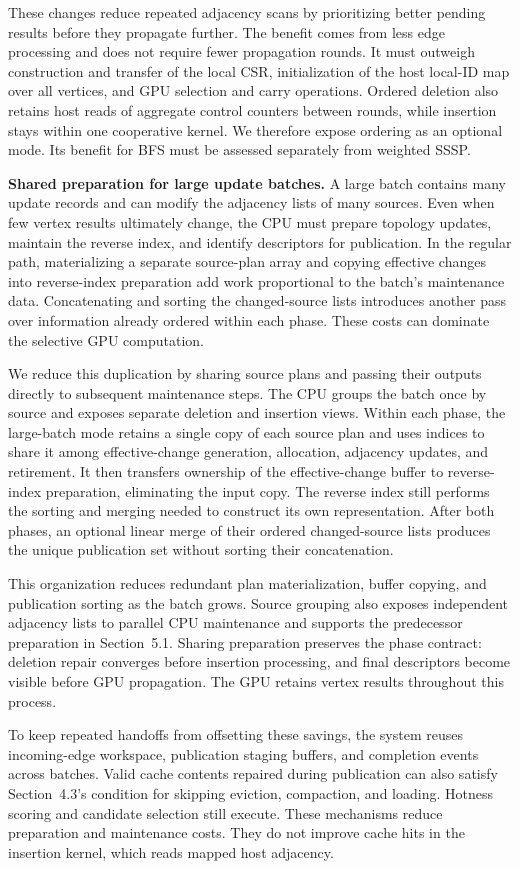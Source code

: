 These changes reduce repeated adjacency scans by prioritizing better pending results before they propagate further. The benefit comes from less edge processing and does not require fewer propagation rounds. It must outweigh construction and transfer of the local CSR, initialization of the host local-ID map over all vertices, and GPU selection and carry operations. Ordered deletion also retains host reads of aggregate control counters between rounds, while insertion stays within one cooperative kernel. We therefore expose ordering as an optional mode. Its benefit for BFS must be assessed separately from weighted SSSP.

\textbf{Shared preparation for large update batches.} A large batch contains many update records and can modify the adjacency lists of many sources. Even when few vertex results ultimately change, the CPU must prepare topology updates, maintain the reverse index, and identify descriptors for publication. In the regular path, materializing a separate source-plan array and copying effective changes into reverse-index preparation add work proportional to the batch's maintenance data. Concatenating and sorting the changed-source lists introduces another pass over information already ordered within each phase. These costs can dominate the selective GPU computation.

We reduce this duplication by sharing source plans and passing their outputs directly to subsequent maintenance steps. The CPU groups the batch once by source and exposes separate deletion and insertion views. Within each phase, the large-batch mode retains a single copy of each source plan and uses indices to share it among effective-change generation, allocation, adjacency updates, and retirement. It then transfers ownership of the effective-change buffer to reverse-index preparation, eliminating the input copy. The reverse index still performs the sorting and merging needed to construct its own representation. After both phases, an optional linear merge of their ordered changed-source lists produces the unique publication set without sorting their concatenation.

This organization reduces redundant plan materialization, buffer copying, and publication sorting as the batch grows. Source grouping also exposes independent adjacency lists to parallel CPU maintenance and supports the predecessor preparation in Section~5.1. Sharing preparation preserves the phase contract: deletion repair converges before insertion processing, and final descriptors become visible before GPU propagation. The GPU retains vertex results throughout this process.

To keep repeated handoffs from offsetting these savings, the system reuses incoming-edge workspace, publication staging buffers, and completion events across batches. Valid cache contents repaired during publication can also satisfy Section~4.3's condition for skipping eviction, compaction, and loading. Hotness scoring and candidate selection still execute. These mechanisms reduce preparation and maintenance costs. They do not improve cache hits in the insertion kernel, which reads mapped host adjacency.
